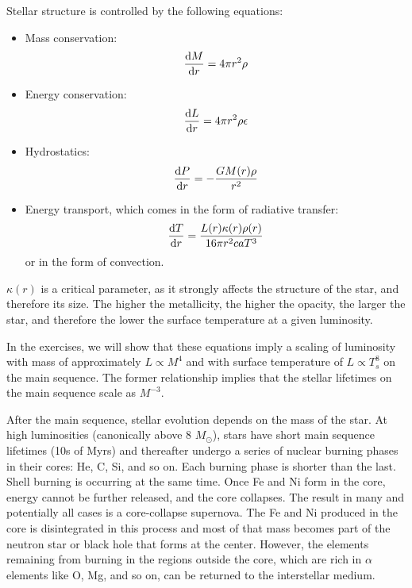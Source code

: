 Stellar structure is controlled by the following equations:
\begin{itemize}
\item Mass conservation:
\begin{equation}
\frac{{\rm d}M}{{\rm d}r} = 4 \pi r^2 \rho
\end{equation}
\item Energy conservation:
\begin{equation}
\frac{{\rm d}L}{{\rm d}r} = 4 \pi r^2 \rho \epsilon
\end{equation}
\item Hydrostatics:
\begin{equation}
\frac{{\rm d}P}{{\rm d}r} = - \frac{GM(r) \rho}{r^2}
\end{equation}
\item Energy transport, which comes in the form of radiative transfer:
\begin{equation}
\frac{{\rm d}T}{{\rm d}r} = \frac{L(r)\kappa(r) \rho(r)}{16\pi r^2 c a T^3}
\end{equation}
or in the form of convection.
\end{itemize}
$\kappa(r)$ is a critical parameter, as it strongly affects the
structure of the star, and therefore its size. The higher the
metallicity, the higher the opacity, the larger the star, and
therefore the lower the surface temperature at a given luminosity.

In the exercises, we will show that these equations imply a scaling of
luminosity with mass of approximately $L\propto M^4$ and with surface
temperature of $L\propto T_s^8$ on the main sequence.  The former
relationship implies that the stellar lifetimes on the main sequence
scale as $M^{-3}$.

After the main sequence, stellar evolution depends on the mass of the
star. At high luminosities (canonically above 8 $M_\odot$), stars have
short main sequence lifetimes (10s of Myrs) and thereafter undergo a
series of nuclear burning phases in their cores: He, C, Si, and so
on. Each burning phase is shorter than the last.  Shell burning is
occurring at the same time. Once Fe and Ni form in the core, energy
cannot be further released, and the core collapses. The result in many
and potentially all cases is a core-collapse supernova. The Fe and Ni
produced in the core is disintegrated in this process and most of that
mass becomes part of the neutron star or black hole that forms at the
center. However, the elements remaining from burning in the regions
outside the core, which are rich in $\alpha$ elements like O, Mg, and
so on, can be returned to the interstellar medium.

